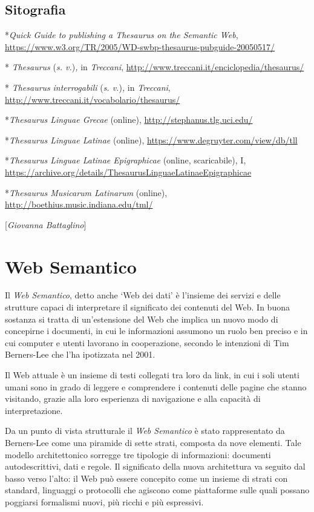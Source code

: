 \section*{Sitografia}
{\parindent0pt 
*\emph{Quick Guide to publishing a Thesaurus on the Semantic Web},
\url{https://www.w3.org/TR/2005/WD-swbp-thesaurus-pubguide-20050517/}

* \emph{Thesaurus} (\emph{s. v.})\emph{,} in \emph{Treccani},
\url{http://www.treccani.it/enciclopedia/thesaurus/}

* \emph{Thesaurus} \emph{interrogabili} (\emph{s. v.})\emph{,} in
\emph{Treccani},
\url{http://www.treccani.it/vocabolario/thesaurus/}

*\emph{Thesaurus Linguae Grecae} (online),
\url{http://stephanus.tlg.uci.edu/}

*\emph{Thesaurus Linguae Latinae} (online),
\url{https://www.degruyter.com/view/db/tll}

*\emph{Thesaurus Linguae Latinae Epigraphicae} (online, scaricabile), I,
\url{https://archive.org/details/ThesaurusLinguaeLatinaeEpigraphicae}

*\emph{Thesaurus Musicarum Latinarum} (online),
\url{http://boethius.music.indiana.edu/tml/}
}

\hrulefill 
 
{[}\emph{Giovanna Battaglino}{]}




\chapter{Web Semantico}

Il \emph{Web Semantico}, detto anche `Web dei dati' è l'insieme dei
servizi e delle strutture capaci di interpretare il significato dei
contenuti del Web. In buona sostanza si tratta di un'estensione del Web
che implica un nuovo modo di concepirne i documenti, in cui le
informazioni assumono un ruolo ben preciso e in cui computer e utenti
lavorano in cooperazione, secondo le intenzioni di Tim Berners-Lee che
l'ha ipotizzata nel 2001.

Il Web attuale è un insieme di testi collegati tra loro da link, in cui
i soli utenti umani sono in grado di leggere e comprendere i contenuti
delle pagine che stanno visitando, grazie alla loro esperienza di
navigazione e alla capacità di interpretazione.

Da un punto di vista strutturale il \emph{Web Semantico} è stato
rappresentato da Berners-Lee come una piramide di sette strati, composta
da nove elementi. Tale modello architettonico sorregge tre tipologie di
informazioni: documenti autodescrittivi, dati e regole. Il significato
della nuova architettura va seguito dal basso verso l'alto: il Web può
essere concepito come un insieme di strati con standard, linguaggi o
protocolli che agiscono come piattaforme sulle quali possano poggiarsi
formalismi nuovi, più ricchi e più espressivi.

